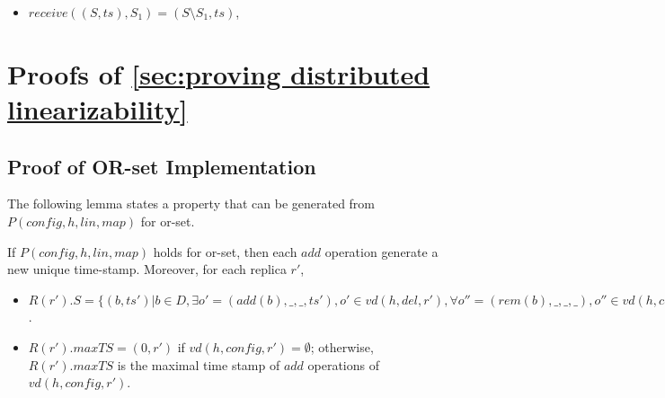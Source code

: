 {\begin{itemize}
\item[-] $\mathit{receive}((S,\mathit{ts}),S_1) = (S \setminus S_1,\mathit{ts})$,
\end{itemize}






\section{\Spec{}}
\label{sec:specification}


















\section{Proofs of \sectionautorefname \ref{sec:proving distributed linearizability}}
\label{sec:appendix proofs of section proving distributed linearizability}





\subsection{Proof of OR-set Implementation}
\label{subsec:appendix proofs of or-set implementation}

The following lemma states a property that can be generated from $P(\mathit{config},h,\mathit{lin},\mathit{map})$ for or-set.

\begin{lemma}
\label{lemma:a property that can be obtained from P for or-set}
If $P(\mathit{config},h,\mathit{lin},\mathit{map})$ holds for or-set, then each $\mathit{add}$ operation generate a new unique time-stamp. Moreover, for each replica $r'$,

\begin{itemize}
    \setlength{\itemsep}{0.5pt}
    \item[-] $R(r').S = \{ (b,\mathit{ts}') \vert b \in D, \exists o' = (\mathit{add}(b),\_,\_,\mathit{ts}'), o' \in \mathit{vd}(h,\mathit{del},r'), \forall o'' = (\mathit{rem}(b),\_,\_,\_), o'' \in \mathit{vd}(h,\mathit{config},r') \Rightarrow (o',o'') \notin h.\mathit{vis} \}$.

    \item[-] $R(r').\mathit{maxTS} = (0,r')$ if $\mathit{vd}(h,\mathit{config},r') = \emptyset$; otherwise, $R(r').\mathit{maxTS}$ is the maximal time stamp of $\mathit{add}$ operations of $\mathit{vd}(h,\mathit{config},r')$.
    \end{itemize}
\end{lemma}

}
